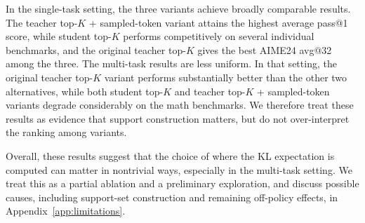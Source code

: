 \documentclass{article}
\begin{document}
\begin{table}[t]
\begin{subtable}{\linewidth}
\centering
{}
\caption{Alternative KL expectation supports in the multi-task setting. We report pass@1 for all math reasoning benchmarks. The final column averages pass@1 metrics only.}
\end{subtable}

\caption{Alternative top-$K$ support variants under single-task and multi-task settings.}
\label{tab:topk_choice}
\vspace{-1em}
\end{table}



In the single-task setting, the three variants achieve broadly comparable results.
The teacher top-$K$ + sampled-token variant attains the highest average pass@1 score, while student top-$K$ performs competitively on several individual benchmarks, and the original teacher top-$K$ gives the best AIME24 avg@32 among the three.
The multi-task results are less uniform.
In that setting, the original teacher top-$K$ variant performs substantially better than the other two alternatives, while both student top-$K$ and teacher top-$K$ + sampled-token variants degrade considerably on the math benchmarks.
We therefore treat these results as evidence that support construction matters, but do not over-interpret the ranking among variants.

Overall, these results suggest that the choice of where the KL expectation is computed can matter in nontrivial ways, especially in the multi-task setting.
We treat this as a partial ablation and a preliminary exploration, and discuss possible causes, including support-set construction and remaining off-policy effects, in Appendix~\ref{app:limitations}.
\end{document}
